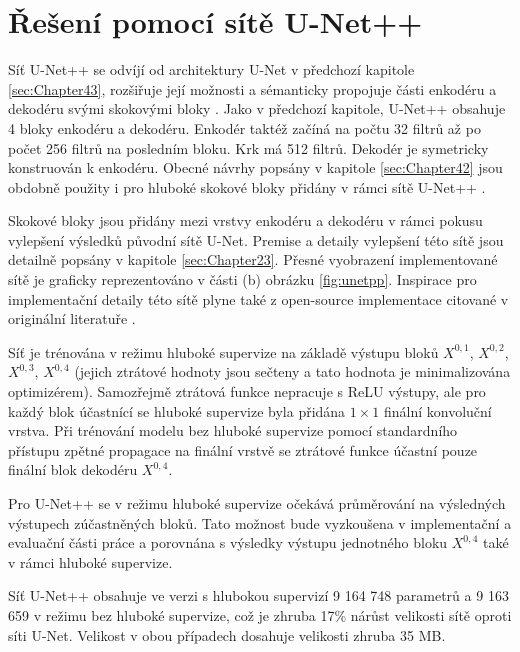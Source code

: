 \section{Řešení pomocí sítě U-Net++}
\label{sec:Chapter44}
Síť U-Net++ se odvíjí od architektury U-Net v předchozí kapitole \ref{sec:Chapter43}, rozšiřuje její možnosti a sémanticky propojuje části enkodéru a dekodéru svými skokovými bloky \cite{unetpp}. Jako v předchozí kapitole, U-Net++ obsahuje 4 bloky enkodéru a dekodéru. Enkodér taktéž začíná na počtu 32 filtrů až po počet 256 filtrů na posledním bloku. Krk má 512 filtrů. Dekodér je symetricky konstruován k enkodéru. Obecné návrhy popsány v kapitole \ref{sec:Chapter42} jsou obdobně použity i pro hluboké skokové bloky přidány v rámci sítě U-Net++ \cite{unetpp}.

Skokové bloky jsou přidány mezi vrstvy enkodéru a dekodéru v rámci pokusu vylepšení výsledků původní sítě U-Net. Premise a detaily vylepšení této sítě jsou detailně popsány v kapitole \ref{sec:Chapter23}. Přesné vyobrazení implementované sítě je graficky reprezentováno v části (b) obrázku \ref{fig:unetpp}. Inspirace pro implementační detaily této sítě plyne také z open-source implementace citované v originální literatuře \cite{unetpp_github}.

Síť je trénována v režimu hluboké supervize na základě výstupu bloků $X^{0,1}$, $X^{0,2}$, $X^{0,3}$, $X^{0,4}$ (jejich ztrátové hodnoty jsou sečteny a tato hodnota je minimalizována optimizérem). Samozřejmě ztrátová funkce nepracuje s ReLU výstupy, ale pro každý blok účastnící se hluboké supervize byla přidána $1\times1$ finální konvoluční vrstva. Při trénování modelu bez hluboké supervize pomocí standardního přístupu zpětné propagace na finální vrstvě se ztrátové funkce účastní pouze finální blok dekodéru $X^{0, 4}$.

Pro U-Net++ se v režimu hluboké supervize očekává průměrování na výsledných výstupech zúčastněných bloků. Tato možnost bude vyzkoušena v implementační a evaluační části práce a porovnána s výsledky výstupu jednotného bloku $X^{0, 4}$ také v rámci hluboké supervize.

Síť U-Net++ obsahuje ve verzi s hlubokou supervizí 9 164 748 parametrů a 9 163 659 v režimu bez hluboké supervize, což je zhruba 17\% nárůst velikosti sítě oproti síti U-Net. Velikost v obou případech dosahuje velikosti zhruba 35 MB.
\endinput